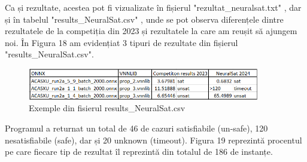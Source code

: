 \documentclass[12pt,a4paper]{article}
\theoremstyle{definition}
\theoremstyle{remark}
\begin{document}
Ca și rezultate, acestea pot fi vizualizate în fișierul "rezultat\_neuralsat.txt" \cite{ref3}, dar și în tabelul "results\_NeuralSat.csv" \cite{ref4}, unde se pot observa diferențele dintre rezultatele de la competiția din 2023 și rezultatele la care am reușit să ajungem noi. În Figura 18 am evidențiat 3 tipuri de rezultate din fișierul "results\_NeuralSat.csv".  \par
\begin{figure}[h!]
  \centering
    \includegraphics[width=0.9\textwidth]{rezultat2.png}
    \caption{Exemple din fisierul results\_NeuralSat.csv}
\end{figure}
Programul a returnat un total de 46 de cazuri satisfiabile (un-safe), 120 nesatisfiabile (safe), dar și 20 unknown (timeout). Figura 19 reprezintă procentul pe care fiecare tip de rezultat îl reprezintă din totalul de 186 de instanțe. \par
\newpage
\end{document}
